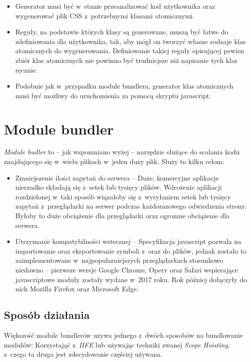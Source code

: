 \documentclass{SGGW-thesis}
\begin{document}
\begin{itemize}
    \begin{itemize}
        \item Generator musi być w~stanie przeanalizować kod użytkownika oraz wygenerować plik CSS z~potrzebnymi klasami atomicznymi.
        \item Reguły, na podstawie których klasy są generowane, muszą być łatwe do zdefiniowania dla użytkownika, tak, aby mógł on tworzyć własne rodzaje klas atomicznych do wygenerowania. Definiowanie takiej reguły opisującej pewien zbiór klas atomicznych nie powinno być trudniejsze niż napisanie tych klas ręcznie.
        \item Podobnie jak w~przypadku module bundlera, generator klas atomicznych musi być możliwy do uruchomienia za pomocą skryptu javascript.
    \end{itemize}
\end{itemize}


\chapter{Module bundler}
\emph{Module budler} to -- jak wspomniano wyżej -- narzędzie służące do scalania kodu znajdującego się w~wielu plikach w~jeden duży plik. Służy to kilku celom:
\begin{itemize}
    \item Zmniejszenie ilości zapytań do serwera -- Duże, komercyjne aplikacje nierzadko składają się z~setek lub tysięcy plików. Wdrożenie aplikacji rozdzielonej w~taki sposób wiązałoby się z~wysyłaniem setek lub tysięcy zapytań z~przeglądarki na serwer podczas każdorazowego odwiedzenia strony. Byłoby to duże obciążenie dla przeglądarki oraz ogromne obciążenie dla serwera.
    \item Utrzymanie kompatybilności wstecznej -- Specyfikacja javascript pozwala na importowanie oraz eksportowanie symboli z~oraz do plików, jednak zostało to zaimplementowane w~najpopularniejszych przeglądarkach stosunkowo niedawno -- pierwsze wersje Google Chrome, Opery oraz Safari wspierające javascriptowe moduły zostały wydane w~2017 roku. Rok później dołączyły do nich Mozilla Firefox oraz Microsoft Edge.\cite{es6_modules_support}
\end{itemize}


\section{Sposób działania}
Większość module bundlerów używa jednego z~dwóch sposobów na bundlowanie modułów: Korzystająć z~\emph{IIFE} lub używając techniki zwanej \emph{Scope Hoisting}, z~czego ta druga jest zdecydowanie częściej używana\cite{parcel_scope_hoisting}.
\end{document}
